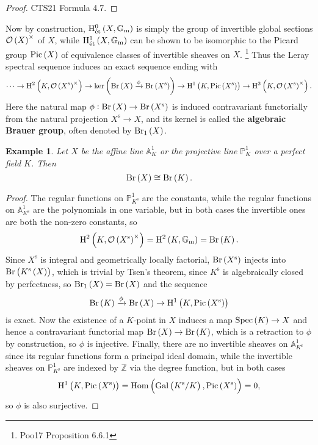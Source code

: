 \documentclass{article}
\newtheorem*{example}{Example}
\renewcommand{\AA}{\mathbb{A}}
\newcommand{\br}{\del}
\newcommand{\Br}{\mathrm{Br}}
\newcommand{\et}{\mathrm{\acute{e}t}}
\newcommand{\Gal}{\mathrm{Gal}}
\newcommand{\Gm}{\mathbb{G}_\mathrm{m}}
\renewcommand{\H}{\mathrm{H}}
\newcommand{\Hom}{\mathrm{Hom}}
\newcommand{\OOO}{\mathcal{O}}
\newcommand{\Pic}{\mathrm{Pic}}
\newcommand{\PP}{\mathbb{P}}
\newcommand{\s}{\mathrm{s}}
\newcommand{\Spec}{\mathrm{Spec}}
\newcommand{\ZZ}{\mathbb{Z}}
\begin{document}
\begin{proof}
CTS21 Formula 4.7.
\end{proof}

Now by construction, $ \H_\et^0\br{X, \Gm} $ is simply the group of invertible global sections $ \OOO\br{X}^\times $ of $ X $, while $ \H_\et^1\br{X, \Gm} $ can be shown to be isomorphic to the Picard group $ \Pic\br{X} $ of equivalence classes of invertible sheaves on $ X $. \footnote{Poo17 Proposition 6.6.1} Thus the Leray spectral sequence induces an exact sequence ending with
$$ \dots \to \H^2\br{K, \OOO\br{X^\s}^\times} \to \ker\br{\Br\br{X} \xrightarrow{\phi} \Br\br{X^\s}} \to \H^1\br{K, \Pic\br{X^\s}} \to \H^3\br{K, \OOO\br{X^\s}^\times}. $$
Here the natural map $ \phi : \Br\br{X} \to \Br\br{X^\s} $ is induced contravariant functorially from the natural projection $ X^\s \to X $, and its kernel is called the \textbf{algebraic Brauer group}, often denoted by $ \Br_1\br{X} $.

\begin{example}
Let $ X $ be the affine line $ \AA_K^1 $ or the projective line $ \PP_K^1 $ over a perfect field $ K $. Then
$$ \Br\br{X} \cong \Br\br{K}. $$
\end{example}

\begin{proof}
The regular functions on $ \PP_{K^\s}^1 $ are the constants, while the regular functions on $ \AA_{K^\s}^1 $ are the polynomials in one variable, but in both cases the invertible ones are both the non-zero constants, so
$$ \H^2\br{K, \OOO\br{X^\s}^\times} = \H^2\br{K, \Gm} = \Br\br{K}. $$
Since $ X^\s $ is integral and geometrically locally factorial, $ \Br\br{X^\s} $ injects into $ \Br\br{K^\s\br{X}} $, which is trivial by Tsen's theorem, since $ K^\s $ is algebraically closed by perfectness, so $ \Br_1\br{X} = \Br\br{X} $ and the sequence
$$ \Br\br{K} \xrightarrow{\phi} \Br\br{X} \to \H^1\br{K, \Pic\br{X^\s}} $$
is exact. Now the existence of a $ K $-point in $ X $ induces a map $ \Spec\br{K} \to X $ and hence a contravariant functorial map $ \Br\br{X} \to \Br\br{K} $, which is a retraction to $ \phi $ by construction, so $ \phi $ is injective. Finally, there are no invertible sheaves on $ \AA_{K^\s}^1 $ since its regular functions form a principal ideal domain, while the invertible sheaves on $ \PP_{K^\s}^1 $ are indexed by $ \ZZ $ via the degree function, but in both cases
$$ \H^1\br{K, \Pic\br{X^\s}} = \Hom\br{\Gal\br{K^\s / K}, \Pic\br{X^\s}} = 0, $$
so $ \phi $ is also surjective.
\end{proof}
\end{document}
